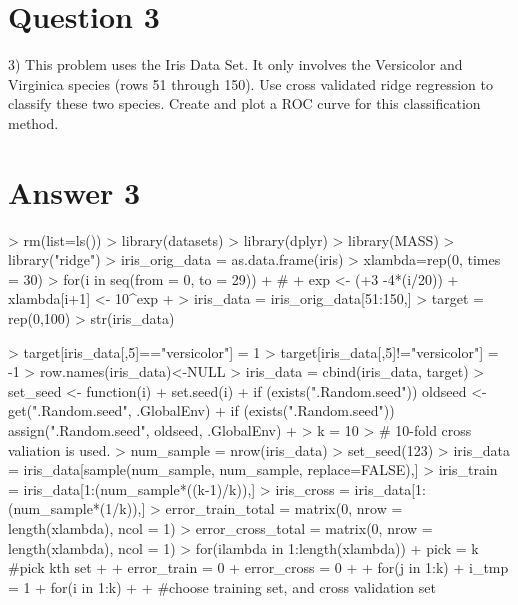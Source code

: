 \documentclass{article}
\begin{document}
\section*{Question 3}
3) This problem uses the Iris Data Set. It only involves the Versicolor and
Virginica species (rows 51 through 150). Use cross validated ridge
regression to classify these two species. Create and plot a ROC curve for
this classification method.
\section*{Answer 3}
\begin{Schunk}
\begin{Sinput}
> rm(list=ls())
> library(datasets)
> library(dplyr)
> library(MASS)
> library("ridge")
> iris_orig_data = as.data.frame(iris)
> xlambda=rep(0, times = 30)
> for(i in seq(from = 0, to = 29)){
+   #
+   exp <- (+3 -4*(i/20))
+   xlambda[i+1] <- 10^exp
+ }
> iris_data = iris_orig_data[51:150,]
> target = rep(0,100)
> str(iris_data)
\end{Sinput}
\begin{Sinput}
> target[iris_data[,5]=="versicolor"] = 1
> target[iris_data[,5]!="versicolor"] = -1
> row.names(iris_data)<-NULL
> iris_data = cbind(iris_data, target)
> set_seed <- function(i) {
+   set.seed(i)
+   if (exists(".Random.seed"))  oldseed <- get(".Random.seed", .GlobalEnv)
+   if (exists(".Random.seed"))  assign(".Random.seed", oldseed, .GlobalEnv)
+ }
> k = 10
> # 10-fold cross valiation is used.
> num_sample = nrow(iris_data)
> set_seed(123)
> iris_data = iris_data[sample(num_sample, num_sample, replace=FALSE),]
> iris_train = iris_data[1:(num_sample*((k-1)/k)),]
> iris_cross = iris_data[1:(num_sample*(1/k)),]
> error_train_total = matrix(0, nrow = length(xlambda), ncol = 1)
> error_cross_total = matrix(0, nrow = length(xlambda), ncol = 1)
> for(ilambda in 1:length(xlambda)){
+   pick = k #pick kth set
+   
+   error_train = 0
+   error_cross = 0
+   
+   for(j in 1:k){
+     i_tmp = 1
+     for(i in 1:k){
+       
+       #choose training set, and cross validation set 
}}}
\end{Sinput}
\end{Schunk}
\end{document}
